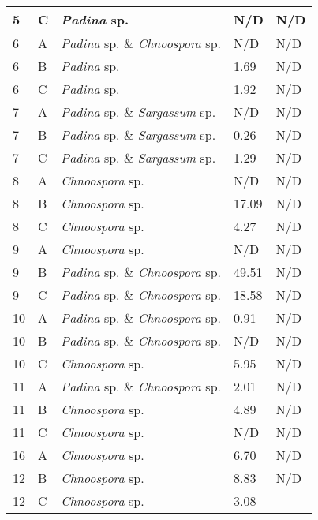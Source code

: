 \documentclass[12pt]{article}
\begin{document}
\begin{longtable}{ | p{2cm} | p{2cm} | p{3cm} | p{3.5cm} | p{3.5cm} | }
\hline
5
&C&\emph{Padina} sp.&N/D&N/D\\
\hline
6&A&\emph{Padina} sp. \& \emph{Chnoospora} sp.&N/D&N/D\\ %
\hline
6&B&\emph{Padina} sp.&1.69
&N/D\\
\hline
6&C&\emph{Padina} sp.&1.92
&N/D\\
\hline
7 %
&A&
\emph{Padina} sp. \& \emph{Sargassum} sp.&N/D&N/D\\
\hline
7 
&B&\emph{Padina} sp. \& \emph{Sargassum} sp.&0.26&N/D\\
\hline
7 
&C&\emph{Padina} sp. \& \emph{Sargassum} sp.&1.29&N/D\\
\hline
8&A&\emph{Chnoospora} sp.&N/D&N/D\\ %
\hline
8&B&\emph{Chnoospora} sp.&17.09
&N/D\\
\hline
8&C&\emph{Chnoospora} sp.&4.27
&N/D\\
\hline
9&A&\emph{Chnoospora} sp.&N/D&N/D\\
\hline
9&B&\emph{Padina} sp. \& \emph{Chnoospora} sp.&49.51
&N/D\\
\hline
9&C&\emph{Padina} sp. \& \emph{Chnoospora} sp.&18.58 %
&N/D\\
\hline
10&A&\emph{Padina} sp. \& \emph{Chnoospora} sp.&0.91
&N/D\\
\hline
10&B&\emph{Padina} sp. \& \emph{Chnoospora} sp.&N/D&N/D\\
\hline
10&C&\emph{Chnoospora} sp.&5.95
&N/D\\
\hline
11&A&\emph{Padina} sp. \& \emph{Chnoospora} sp.&2.01 %
&N/D\\
\hline
11&B&\emph{Chnoospora} sp.&4.89
&N/D\\
\hline
11&C&\emph{Chnoospora} sp.&N/D&N/D\\
\hline
16&A&\emph{Chnoospora} sp.&6.70&N/D\\
\hline
12&B&\emph{Chnoospora} sp.&8.83
&N/D\\
\hline
12&C&\emph{Chnoospora} sp.&3.08

\end{longtable}
\end{document}
